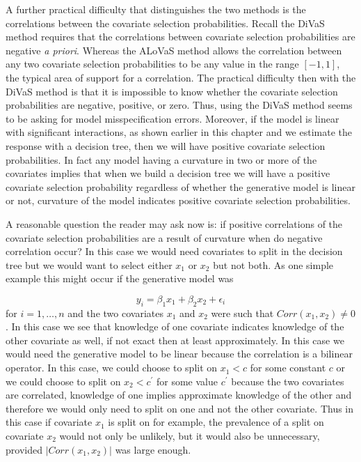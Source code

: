 A further practical difficulty that distinguishes the two methods is the correlations between the covariate selection probabilities. Recall the DiVaS method requires that the correlations between covariate selection probabilities are negative \emph{a priori}. Whereas the ALoVaS method allows the correlation between any two covariate selection probabilities to be any value in the range $[-1,1]$, the typical area of support for a correlation. The practical difficulty then with the DiVaS method is that it is impossible to know whether the covariate selection probabilities are negative, positive, or zero. Thus, using the DiVaS method seems to be asking for model misspecification errors. Moreover, if the model is linear with significant interactions, as shown earlier in this chapter and we estimate the response with a decision tree, then we will have positive covariate selection probabilities. 
In fact any model having a curvature in two or more of the covariates implies that when we build a decision tree we will have a positive covariate selection probability regardless of whether the generative model is linear or not, curvature of the model indicates positive covariate selection probabilities. 

A reasonable question the reader may ask now is: if positive correlations of the covariate selection probabilities are a result of curvature when do negative correlation occur? In this case we would need covariates to split in the decision tree but we would want to select either $x_1$ or $x_2$ but not both. As one simple example this might occur if the generative model was 

\begin{equation}
y_i = \beta_1x_1 + \beta_2x_2 + \epsilon_i
\end{equation}
 for $i=1, \dots, n$ and the two covariates $x_1$ and $x_2$ were such that $Corr(x_1, x_2) \neq 0$. In this case we see that knowledge of one covariate indicates knowledge of the other covariate as well, if not exact then at least approximately.   In this case we would need the generative model to be linear because the correlation  is a bilinear operator. In this case, we could choose to split on $x_1<c$ for some constant $c$ or we could choose to split on $x_2 < c^\prime$ for some value $c^\prime$ because the two covariates are correlated, knowledge of one implies approximate knowledge of the other and therefore we would only need to split on one and not the other covariate. Thus in this case if covariate $x_1$ is split on for example, the prevalence of a split on covariate $x_2$ would not only be unlikely, but it would also be unnecessary, provided  $|Corr(x_1, x_2)|$ was large enough. 
 
